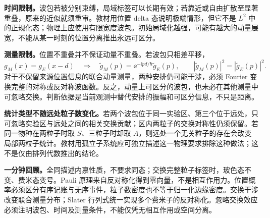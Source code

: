 \textbf{时间限制。}波包若被分别束缚，局域标签可以长期有效；若靠近或自由扩散至显著重叠，原来的近似就须重审。教材用位置 delta 态说明极端情形，但它不是 $L^2$ 中的正规化态；物理上应使用有限宽度波包。初始局域化越强，可能有越大的动量展宽，不能从某一时刻的位置分离推出永远可区分。

\textbf{测量限制。}位置不重叠并不保证动量不重叠。若波包只相差平移，
\begin{equation}
  g_M(x)=g_E(x-d)
  \quad\Longrightarrow\quad
  \widetilde g_M(p)=\ee^{-\ii pd/\hbar}\widetilde g_E(p),\qquad
  |\widetilde g_M(p)|^2=|\widetilde g_E(p)|^2.
\end{equation}
对于不保留来源位置信息的联合动量测量，两种安排仍可能干涉，必须 Fourier 变换完整的对称或反对称波函数。反之，动量上可区分的波包，也未必在其他测量中可忽略交换。判断依据是当前观测中替代安排的振幅和可区分信息，不只是距离。

\textbf{统计类型不随远处粒子数变化。}若两个波包位于同一实验区、第三个位于远处，只可忽略实验区与远处之间的相关交换贡献；区内两粒子的交换对称性仍须保留。若同一物种在两粒子时取 $S$、三粒子时却取 $A$，则远处一个无关粒子的存在会改变局部两粒子统计。教材用孤立子系统应可独立描述这一物理要求排除这种做法；这不是仅由排列代数推出的结论。

\textbf{一分钟回顾。}全同描述内禀性质，不要求同态；交换完整粒子标签时，玻色态不变、费米态变号。Pauli 原理来自反对称化得到零向量，不是相互作用力。位置概率必须区分有序记账与无序事件，粒子数密度也不等于归一化边缘密度。交换干涉改变联合测量分布；Slater 行列式统一实现多个费米子的反对称化。忽略交换效应必须注明波包、时间及测量条件，不能仅凭无相互作用或空间分离。
